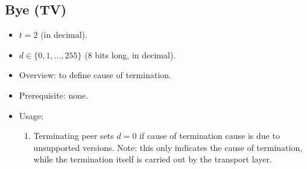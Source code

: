 \documentclass{article}
\begin{document}
\subsection{Bye (TV)}
\begin{itemize}
    \item $t = 2$ (in decimal).
    \item $d \in \{0,1,\ldots,255\}$ (8 bits long, in decimal).
    \item Overview: to define cause of termination. 
    \item Prerequisite: none.
    \item Usage:
        \begin{enumerate}
            \item Terminating peer sets $d=0$ if cause of termination cause is
            due to unsupported versions. Note: this only indicates the cause of
            termination, while the termination itself is carried out by the
            transport layer.
        \end{enumerate}
\end{itemize}
\end{document}
